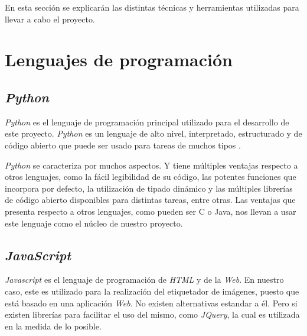 

En esta sección se explicarán las distintas técnicas y herramientas utilizadas para llevar a cabo el proyecto.

\section{Lenguajes de programación}

\subsection{\textit{Python}}
\textit{Python} es el lenguaje de programación principal utilizado para el desarrollo de este proyecto. \textit{Python} es un lenguaje de alto nivel, interpretado, estructurado y de código abierto que puede ser usado para tareas de muchos tipos \cite{wiki:python}.

\textit{Python} se caracteriza por muchos aspectos. Y tiene múltiples ventajas respecto a otros lenguajes, como la fácil legibilidad de su código, las potentes funciones que incorpora por defecto, la utilización de tipado dinámico y las múltiples librerías de código abierto disponibles para distintas tareas, entre otras. Las ventajas que presenta respecto a otros lenguajes, como pueden ser C o Java, nos llevan a usar este lenguaje como el núcleo de nuestro proyecto.

\subsection{\textit{JavaScript}}
\textit{Javascript} es el lenguaje de programación de \textit{HTML} y de la \textit{Web}\cite{w3schools:javascript}. En nuestro caso, este es utilizado para la realización del etiquetador de imágenes, puesto que está basado en una aplicación \textit{Web}. No existen alternativas estandar a él. Pero si existen librerías para facilitar el uso del mismo, como \textit{JQuery}, la cual es utilizada en la medida de lo posible.

